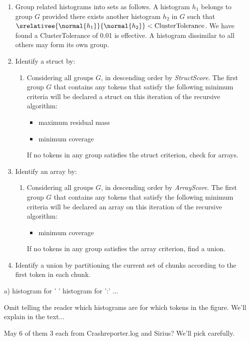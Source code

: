 \begin {enumerate}
\item Group related histograms into sets as follows.  
A histogram $h_1$ belongs to
group $G$ provided there exists another histogram $h_2$ in $G$
such that $\srelativee{\normal{h_1}}{\normal{h_2}} < 
\mathrm{ClusterTolerance}$.  We have found a ClusterTolerance
of 0.01 is effective.  A histogram dissimilar to all others may form 
its own group.

\item Identify a struct by:
\begin {enumerate}
\item  Considering all groups $G$, in descending order by {\em StructScore}.
The first group $G$ that contains any tokens that satisfy the
 following minimum criteria will be declared a struct on this 
iteration of the recursive algorithm:
\begin {itemize}
\item maximum residual mass
\item minimum coverage
\end{itemize}
If no tokens in any group satisfies the struct criterion, check for arrays.
\end{enumerate}
\item Identify an array by:
\begin {enumerate}
\item  Considering all groups $G$, in descending order by {\em ArrayScore}.
The first group $G$ that contains any tokens that satisfy the
 following minimum criteria will be declared an array on this 
iteration of the recursive algorithm:
\begin {itemize}
\item minimum coverage
\end{itemize}
If no tokens in any group satisfies the array criterion, find a union.
\end{enumerate}
\item Identify a union by partitioning the current set of chunks according
to the first token in each chunk.
\end{enumerate}

\begin {figure*}

a) histogram for ' '
histogram for ':'
...

Omit telling the reader which histograms are for which tokens in the figure.
We'll explain in the text...

May 6 of them 3 each from Crashreporter.log and Sirius?
We'll pick carefully.
\caption{Selected Histograms for Crashreporter.log and Sirius}
\label{fig:histograms} 
\end{figure*}

